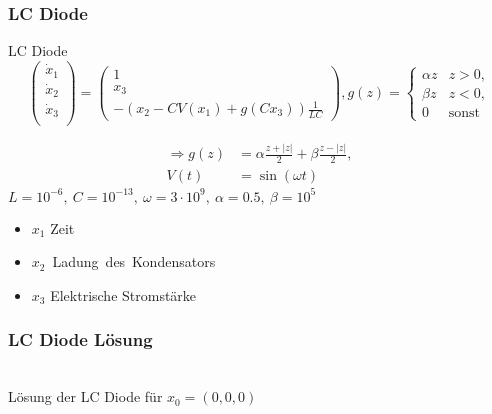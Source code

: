 \begin{frame}[<+->]
\frametitle{LC Diode}
\begin{block}{LC Diode}
\vspace*{-0.3cm}
\[
 \begin{pmatrix}
  \dot x_1\\
  \dot x_2\\
  \dot x_3\\
 \end{pmatrix}
 = 
 \begin{pmatrix}
  1\\
  x_3\\
  -\left(x_2-CV(x_1) + g(Cx_3)\right)\frac{1}{LC}
 \end{pmatrix},
 g(z) = \begin{cases}
      \alpha z & z> 0,\\
      \beta z & z< 0,\\
0 & \text{sonst}
      \end{cases}
\]
\end{block}
\begin{minipage}{0.45\linewidth}

\end{minipage}
\begin{minipage}{0.45\linewidth}
\centering
\vspace*{-0.3cm}
 \begin{align*}
 \Rightarrow g(z) &= \alpha\frac{z+|z|}{2} + \beta\frac{z-|z|}{2},\\
  V(t) &= \sin(\omega t)
 \end{align*}
 \pause
 $ L= 10^{-6},~ C=10^{-13},~ \omega = 3\cdot 10^{9},~\alpha =0.5,~\beta = 10^{5}$
 \pause
\begin{itemize}
\item $x_1$ Zeit
 \item $x_2$~Ladung~des~Kondensators
 \item $x_3$ Elektrische Stromstärke
\end{itemize}
\end{minipage}
 \end{frame}
 \begin{frame}[<+->]
\frametitle{LC Diode Lösung}
\begin{minipage}{0.45\linewidth}
  
\end{minipage}  
\begin{minipage}{0.45\linewidth}
  
\end{minipage}
\centering
\\[0.3cm]
Lösung der LC Diode für $x_0=(0,0,0)$
\end{frame}

